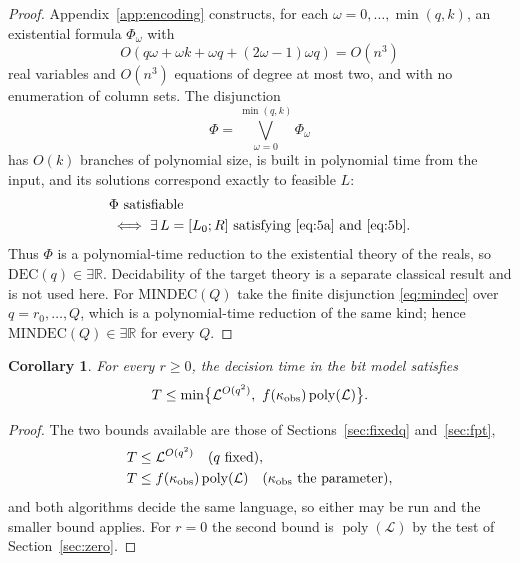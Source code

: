 \documentclass[journal]{IEEEtran}
\theoremstyle{plainn}
\newtheorem{cor}[thm]{Corollary}
\theoremstyle{remark}
\begin{document}
\begin{proof}
Appendix~\ref{app:encoding} constructs, for each $\omega=0,\dots,\min(q,k)$, an existential formula $\Phi_\omega$ with
\begin{equation*}
O(q\omega+\omega k+\omega q+(2\omega-1)\omega q)=O(n^3)
\end{equation*}
real variables and $O(n^3)$ equations of degree at most two, and with no enumeration of column sets. The disjunction
\begin{equation}\label{eq:existsr-disj}
\Phi=\bigvee_{\omega=0}^{\min(q,k)}\Phi_\omega
\end{equation}
has $O(k)$ branches of polynomial size, is built in polynomial time from the input, and its solutions correspond exactly to feasible $L$:
\begin{equation*}
\begin{aligned}
&\Phi\ \text{satisfiable}\\
&\iff\exists\,L=[L_0;R]\ \text{satisfying}\ \eqref{eq:5a}\ \text{and}\ \eqref{eq:5b}.
\end{aligned}
\end{equation*}
Thus $\Phi$ is a polynomial-time reduction to the existential theory of the reals, so $\mathrm{DEC}(q)\in\exists\mathbb R$. Decidability of the target theory is a separate classical result and is not used here. For $\mathrm{MINDEC}(Q)$ take the finite disjunction \eqref{eq:mindec} over $q=r_0,\dots,Q$, which is a polynomial-time reduction of the same kind; hence $\mathrm{MINDEC}(Q)\in\exists\mathbb R$ for every $Q$.
\end{proof}

\begin{cor}\label{cor:time}
For every $r\ge0$, the decision time in the bit model satisfies
\begin{equation*}
T\le\min\bigl\{\mathcal L^{O(q^2)},\ f(\kappa_{\rm obs})\operatorname{poly}(\mathcal L)\bigr\}.
\end{equation*}
\end{cor}

\begin{proof}
The two bounds available are those of Sections~\ref{sec:fixedq} and~\ref{sec:fpt},
\begin{equation*}
\begin{aligned}
T&\le\mathcal L^{O(q^2)}\quad(q\ \text{fixed}),\\
T&\le f(\kappa_{\rm obs})\operatorname{poly}(\mathcal L)\quad(\kappa_{\rm obs}\ \text{the parameter}),
\end{aligned}
\end{equation*}
and both algorithms decide the same language, so either may be run and the smaller bound applies. For $r=0$ the second bound is $\operatorname{poly}(\mathcal L)$ by the test of Section~\ref{sec:zero}.
\end{proof}
\end{document}

